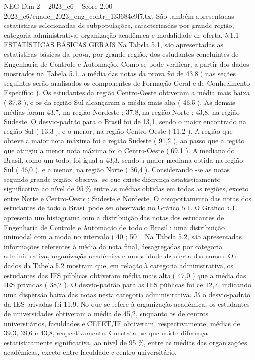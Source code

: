 \begin{textsample}{NEG Dim 2 – 2023\_c6 – Score 2.00 – 2023\_c6/enade\_2023\_eng\_contr\_133684c9f7.txt}
São também apresentadas estatísticas selecionadas de subpopulações, caracterizadas por grande região, categoria administrativa, organização acadêmica e modalidade de oferta. 5.1.1 ESTATÍSTICAS BÁSICAS GERAIS Na Tabela 5.1, são apresentadas as estatísticas básicas da prova, por grande região, dos estudantes concluintes de Engenharia de Controle e Automação.
Como se pode verificar, a partir dos dados mostrados na Tabela 5.1, a média das notas da prova foi de 43,8 ( nas seções seguintes serão analisados os componentes de Formação Geral e de Conhecimento Específico ).
Os estudantes da região Centro-Oeste obtiveram a média mais baixa ( 37,3 ), e os da região Sul alcançaram a média mais alta ( 46,5 ).
As demais médias foram 43,7, na região Nordeste ; 37,8, na região Norte ; 43,8, na região Sudeste.
O desvio-padrão para o Brasil foi de 13,1, sendo o maior encontrado na região Sul ( 13,3 ), e o menor, na região Centro-Oeste ( 11,2 ).
A região que obteve a maior nota máxima foi a região Sudeste ( 91,2 ), ao passo que a região que atingiu a menor nota máxima foi o Centro-Oeste ( 69,1 ).
A mediana do Brasil, como um todo, foi igual a 43,3, sendo a maior mediana obtida na região Sul ( 46,0 ), e a menor, na região Norte ( 36,4 ).
Considerando -se as notas segundo grande região, observa -se que existe diferença estatisticamente significativa ao nível de 95 \% entre as médias obtidas em todas as regiões, exceto entre Norte e Centro-Oeste ; Sudeste e Nordeste.
O comportamento das notas dos estudantes de todo o Brasil pode ser observado no Gráfico 5.1.
O Gráfico 5.1 apresenta um histograma com a distribuição das notas dos estudantes de Engenharia de Controle e Automação de todo o Brasil : uma distribuição unimodal com a moda no intervalo ( 40 ; 50 ].
Na Tabela 5.2, são apresentadas informações referentes à média da nota final, desagregadas por categoria administrativa, organização acadêmica e modalidade de oferta dos cursos.
Os dados da Tabela 5.2 mostram que, em relação à categoria administrativa, os estudantes das IES públicas obtiveram média mais alta ( 47,0 ) que a média das IES privadas ( 38,2 ).
O desvio-padrão para as IES públicas foi de 12,7, indicando uma dispersão baixa das notas nesta categoria administrativa.
Já o desvio-padrão da IES privadas foi 11,9.
No que se refere à organização acadêmica, os estudantes de universidades obtiveram a média de 45,2, enquanto os de centros universitários, faculdades e CEFET/IF obtiveram, respectivamente, médias de 39,3, 39,6 e 43,8, respectivamente.
Constata -se que existe diferença estatisticamente significativa, ao nível de 95 \%, entre as médias das organizações acadêmicas, exceto entre faculdade e centro universitário.

\end{textsample}
